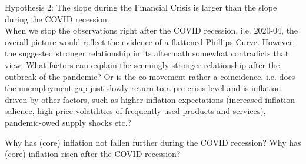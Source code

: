 \documentclass{article}\usepackage[]{graphicx}\usepackage[]{color}
\begin{document}
Hypothesis 2: The slope during the Financial Crisis is larger than the slope during the COVID recession. \\

When we stop the observations right after the COVID recession, i.e. 2020-04, the overall picture would reflect the evidence of a flattened Phillips Curve. However, the suggested stronger relationship in its aftermath somewhat contradicts that view. What factors can explain the seemingly stronger relationship after the outbreak of the pandemic? Or is the co-movement rather a coincidence, i.e. does the unemployment gap just slowly return to a pre-crisis level and is inflation driven by other factors, such as higher inflation expectations (increased inflation salience, high price volatilities of frequently used products and services), pandemic-owed supply shocks etc.?


Why has (core) inflation not fallen further during the COVID recession? 
Why has (core) inflation risen after the COVID recession? 
\end{document}
